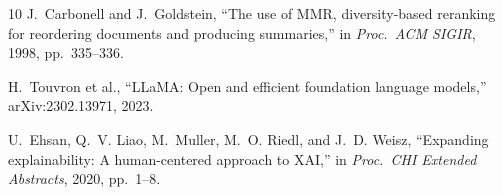 \documentclass[conference]{IEEEtran}
\begin{document}
\begin{thebibliography}{10}
J.~Carbonell and J.~Goldstein, ``The use of MMR, diversity-based reranking for reordering documents and producing summaries,'' in \textit{Proc.\ ACM SIGIR}, 1998, pp.~335--336.

H.~Touvron et al., ``LLaMA: Open and efficient foundation language models,'' arXiv:2302.13971, 2023.

U.~Ehsan, Q.~V. Liao, M.~Muller, M.~O. Riedl, and J.~D. Weisz, ``Expanding explainability: A human-centered approach to XAI,'' in \textit{Proc.\ CHI Extended Abstracts}, 2020, pp.~1--8.

\end{thebibliography}
\end{document}
